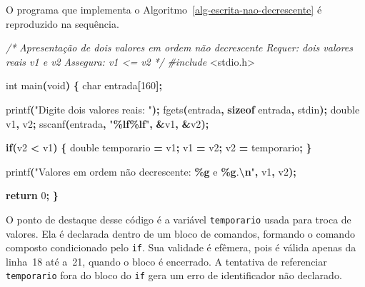 \documentclass[
  11pt,
  a4paper,
]{scrbook}
\newenvironment{Shaded}{\begin{snugshade}}{\end{snugshade}}
\newcommand{\CommentTok}[1]{\textcolor[rgb]{0.56,0.35,0.01}{\textit{#1}}}
\newcommand{\ControlFlowTok}[1]{\textcolor[rgb]{0.13,0.29,0.53}{\textbf{#1}}}
\newcommand{\DataTypeTok}[1]{\textcolor[rgb]{0.13,0.29,0.53}{#1}}
\newcommand{\DecValTok}[1]{\textcolor[rgb]{0.00,0.00,0.81}{#1}}
\newcommand{\ImportTok}[1]{#1}
\newcommand{\KeywordTok}[1]{\textcolor[rgb]{0.13,0.29,0.53}{\textbf{#1}}}
\newcommand{\NormalTok}[1]{#1}
\newcommand{\OperatorTok}[1]{\textcolor[rgb]{0.81,0.36,0.00}{\textbf{#1}}}
\newcommand{\PreprocessorTok}[1]{\textcolor[rgb]{0.56,0.35,0.01}{\textit{#1}}}
\newcommand{\SpecialCharTok}[1]{\textcolor[rgb]{0.81,0.36,0.00}{\textbf{#1}}}
\newcommand{\StringTok}[1]{\textcolor[rgb]{0.31,0.60,0.02}{#1}}
\begin{document}
O programa que implementa o Algoritmo~\ref{alg-escrita-nao-decrescente}
é reproduzido na sequência.

\begin{Shaded}
\begin{Highlighting}[numbers=left,,]
\CommentTok{/*}
\CommentTok{Apresentação de dois valores em ordem não decrescente}
\CommentTok{Requer: dois valores reais v1 e v2}
\CommentTok{Assegura: v1 \textless{}= v2}
\CommentTok{*/}
\PreprocessorTok{\#include }\ImportTok{\textless{}stdio.h\textgreater{}}

\DataTypeTok{int}\NormalTok{ main}\OperatorTok{(}\DataTypeTok{void}\OperatorTok{)} \OperatorTok{\{}
    \DataTypeTok{char}\NormalTok{ entrada}\OperatorTok{[}\DecValTok{160}\OperatorTok{];}

\NormalTok{    printf}\OperatorTok{(}\StringTok{"Digite dois valores reais: "}\OperatorTok{);}
\NormalTok{    fgets}\OperatorTok{(}\NormalTok{entrada}\OperatorTok{,} \KeywordTok{sizeof}\NormalTok{ entrada}\OperatorTok{,}\NormalTok{ stdin}\OperatorTok{);}
    \DataTypeTok{double}\NormalTok{ v1}\OperatorTok{,}\NormalTok{ v2}\OperatorTok{;}
\NormalTok{    sscanf}\OperatorTok{(}\NormalTok{entrada}\OperatorTok{,} \StringTok{"}\SpecialCharTok{\%lf\%lf}\StringTok{"}\OperatorTok{,} \OperatorTok{\&}\NormalTok{v1}\OperatorTok{,} \OperatorTok{\&}\NormalTok{v2}\OperatorTok{);}

    \ControlFlowTok{if}\OperatorTok{(}\NormalTok{v2 }\OperatorTok{\textless{}}\NormalTok{ v1}\OperatorTok{)} \OperatorTok{\{}
        \DataTypeTok{double}\NormalTok{ temporario }\OperatorTok{=}\NormalTok{ v1}\OperatorTok{;}
\NormalTok{        v1 }\OperatorTok{=}\NormalTok{ v2}\OperatorTok{;}
\NormalTok{        v2 }\OperatorTok{=}\NormalTok{ temporario}\OperatorTok{;}
    \OperatorTok{\}}

\NormalTok{    printf}\OperatorTok{(}\StringTok{"Valores em ordem não decrescente: }\SpecialCharTok{\%g}\StringTok{ e }\SpecialCharTok{\%g}\StringTok{.}\SpecialCharTok{\textbackslash{}n}\StringTok{"}\OperatorTok{,}\NormalTok{ v1}\OperatorTok{,}\NormalTok{ v2}\OperatorTok{);}
    
    \ControlFlowTok{return} \DecValTok{0}\OperatorTok{;}
\OperatorTok{\}}
\end{Highlighting}
\end{Shaded}

O ponto de destaque desse código é a variável \texttt{temporario} usada
para troca de valores. Ela é declarada dentro de um bloco de comandos,
formando o comando composto condicionado pelo \texttt{if}. Sua validade
é efêmera, pois é válida apenas da linha~18 até a~21, quando o bloco é
encerrado. A tentativa de referenciar \texttt{temporario} fora do bloco
do \texttt{if} gera um erro de identificador não declarado.
\end{document}
